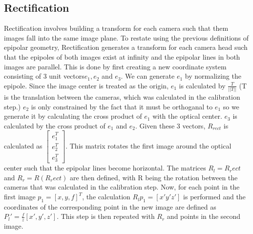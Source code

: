 \subsection{Rectification}
Rectification involves building a transform for each camera such that them images fall into the same image plane.  To restate using the previous definitions of epipolar geometry, Rectification generates a transform for each camera head such that the epipoles of both images exist at infinity and the epipolar lines in both images are parallel.  This is done by first creating a new coordinate system consisting of 3 unit vectors$e_1, e_2$ and $e_3$.  We can generate $e_1$ by normalizing the epipole.  Since the image center is treated as the origin, $e_1$ is calculated by $\frac{T}{||T||}$ (T is the translation between the cameras, which was calculated in the calibration step.)  $e_2$ is only constrained by the fact that it must be orthoganal to $e_1$ so we generate it by calculating the cross product of $e_1$ with the optical center.  $e_3$ is calculated by the cross product of $e_1$ and $e_2$.  Given these 3 vectors, $R_{rect}$ is calculated as $\begin{bmatrix} e_1^T \\ e_2^T \\ e_3^T \end{bmatrix}$.  This matrix rotates the first image around the optical center such that the epipolar lines become horizontal.  The matrices $R_l= R_rect$ and $R_r = R(R_rect)$ are then defined, with R being the rotation between the cameras that was calculated in the calibration step.  Now, for each point in the first image $p_1 = [x, y, f]^T$, the calculation $R_lp_1 = [x'y'z']$ is performed and the coordinates of the corresponding point in the new image are defined as $P_l' = \frac{f}{z}[x',y',z']$.  This step is then repeated with $R_r$ and points in the second image.


